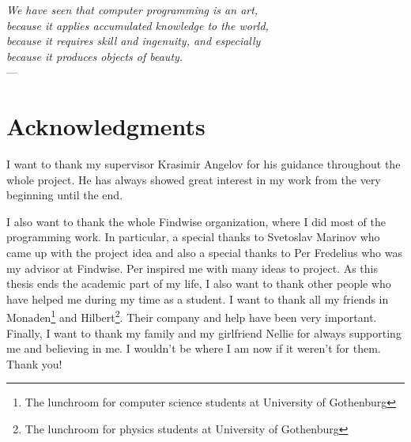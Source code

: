 
\begin{flushright}{\slshape    
    We have seen that computer programming is an art, \\ 
    because it applies accumulated knowledge to the world, \\ 
    because it requires skill and ingenuity, and especially \\
    because it produces objects of beauty.} \\ \medskip
    ---  \citep{knuth:1974}
\end{flushright}



\bigskip

\begingroup
\let\clearpage\relax
\let\cleardoublepage\relax
\let\cleardoublepage\relax
\chapter*{Acknowledgments}
I want to thank my supervisor Krasimir Angelov for his guidance throughout the whole project. He has always showed great interest in my work from the very beginning until the end. 

I also want to thank the whole Findwise organization, where I did most of the programming work. In particular, a special thanks to Svetoslav Marinov who came up with the project idea and also a special thanks to Per Fredelius who was my advisor at Findwise. Per inspired me with many ideas to project. 
\newline
\newline
As this thesis ends the academic part of my life, I also want to thank other people who have helped me during my time as a student.
\newline
\newline
I want to thank all my friends in Monaden\footnote{The lunchroom for computer science students at University of Gothenburg} and Hilbert\footnote{The lunchroom for physics students at University of Gothenburg}. Their company and help have been very important.
\newline
\newline
Finally, I want to thank my family and my girlfriend Nellie for always supporting me and believing in me. I wouldn't be where I am now if it weren't for them.
\newline
\newline
\newline
\newline
Thank you!
\endgroup



